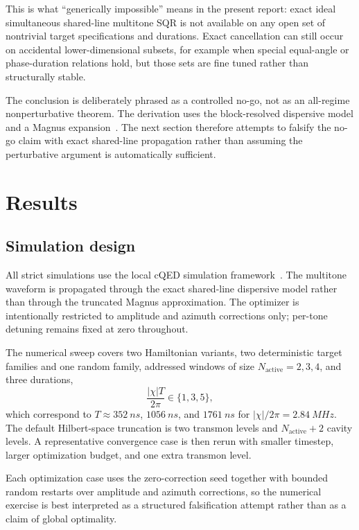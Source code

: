 \documentclass[aps,pra,twocolumn,reprint,floatfix,amsmath,amssymb]{revtex4-2}
\begin{document}
This is what ``generically impossible'' means in the present report: exact ideal simultaneous shared-line multitone SQR is not available on any open set of nontrivial target specifications and durations. Exact cancellation can still occur on accidental lower-dimensional subsets, for example when special equal-angle or phase-duration relations hold, but those sets are fine tuned rather than structurally stable.

The conclusion is deliberately phrased as a controlled no-go, not as an all-regime nonperturbative theorem. The derivation uses the block-resolved dispersive model and a Magnus expansion~\cite{blanes2009magnus}. The next section therefore attempts to falsify the no-go claim with exact shared-line propagation rather than assuming the perturbative argument is automatically sufficient.

\section{Results}
\label{sec:numerics}

\subsection{Simulation design}

All strict simulations use the local cQED simulation framework~\cite{cqed_sim}. The multitone waveform is propagated through the exact shared-line dispersive model rather than through the truncated Magnus approximation. The optimizer is intentionally restricted to amplitude and azimuth corrections only; per-tone detuning remains fixed at zero throughout.

The numerical sweep covers two Hamiltonian variants, two deterministic target families and one random family, addressed windows of size \(N_{\mathrm{active}}=2,3,4\), and three durations,
\begin{equation}
\frac{|\chi|T}{2\pi}\in\{1,3,5\},
\end{equation}
which correspond to \(T \approx \SI{352}{ns}\), \(\SI{1056}{ns}\), and \(\SI{1761}{ns}\) for \(|\chi|/2\pi=\SI{2.84}{MHz}\). The default Hilbert-space truncation is two transmon levels and \(N_{\mathrm{active}}+2\) cavity levels. A representative convergence case is then rerun with smaller timestep, larger optimization budget, and one extra transmon level.

Each optimization case uses the zero-correction seed together with bounded random restarts over amplitude and azimuth corrections, so the numerical exercise is best interpreted as a structured falsification attempt rather than as a claim of global optimality.
\end{document}
